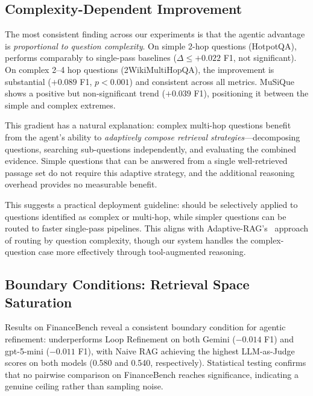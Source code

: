 
\subsection{Complexity-Dependent Improvement}
\label{subsec:complexity}

The most consistent finding across our experiments is that the agentic advantage is \emph{proportional to question complexity}.
On simple 2-hop questions (HotpotQA), \ours{} performs comparably to single-pass baselines ($\Delta \leq +0.022$ F1, not significant).
On complex 2--4 hop questions (2WikiMultiHopQA), the improvement is substantial ($+0.089$ F1, $p < 0.001$) and consistent across all metrics.
MuSiQue shows a positive but non-significant trend ($+0.039$ F1), positioning it between the simple and complex extremes.

This gradient has a natural explanation: complex multi-hop questions benefit from the agent's ability to \emph{adaptively compose retrieval strategies}---decomposing questions, searching sub-questions independently, and evaluating the combined evidence.
Simple questions that can be answered from a single well-retrieved passage set do not require this adaptive strategy, and the additional reasoning overhead provides no measurable benefit.

This suggests a practical deployment guideline: \ours{} should be selectively applied to questions identified as complex or multi-hop, while simpler questions can be routed to faster single-pass pipelines.
This aligns with Adaptive-RAG's~\cite{jeong2024adaptiverag} approach of routing by question complexity, though our system handles the complex-question case more effectively through tool-augmented reasoning.

\subsection{Boundary Conditions: Retrieval Space Saturation}
\label{subsec:boundary}

Results on FinanceBench reveal a consistent boundary condition for agentic refinement: \ours{} underperforms Loop Refinement on both Gemini ($-0.014$ F1) and gpt-5-mini ($-0.011$ F1), with Naive RAG achieving the highest LLM-as-Judge scores on both models (0.580 and 0.540, respectively).
Statistical testing confirms that no pairwise comparison on FinanceBench reaches significance, indicating a genuine ceiling rather than sampling noise.

